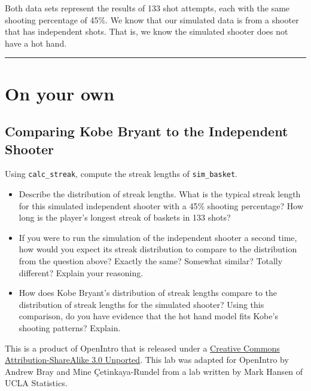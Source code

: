 \documentclass[]{book}
\theoremstyle{definition}
\theoremstyle{definition}
\theoremstyle{remark}
\begin{document}
Both data sets represent the results of 133 shot attempts, each with the
same shooting percentage of 45\%. We know that our simulated data is
from a shooter that has independent shots. That is, we know the
simulated shooter does not have a hot hand.

\begin{center}\rule{0.5\linewidth}{\linethickness}\end{center}

\section*{On your own}\label{on-your-own}

\subsection*{Comparing Kobe Bryant to the Independent
Shooter}\label{comparing-kobe-bryant-to-the-independent-shooter}

Using \texttt{calc\_streak}, compute the streak lengths of
\texttt{sim\_basket}.

\begin{itemize}
\item
  Describe the distribution of streak lengths. What is the typical
  streak length for this simulated independent shooter with a 45\%
  shooting percentage? How long is the player's longest streak of
  baskets in 133 shots?
\item
  If you were to run the simulation of the independent shooter a second
  time, how would you expect its streak distribution to compare to the
  distribution from the question above? Exactly the same? Somewhat
  similar? Totally different? Explain your reasoning.
\item
  How does Kobe Bryant's distribution of streak lengths compare to the
  distribution of streak lengths for the simulated shooter? Using this
  comparison, do you have evidence that the hot hand model fits Kobe's
  shooting patterns? Explain.
\end{itemize}

\hypertarget{license}{}
This is a product of OpenIntro that is released under a
\href{http://creativecommons.org/licenses/by-sa/3.0}{Creative Commons
Attribution-ShareAlike 3.0 Unported}. This lab was adapted for OpenIntro
by Andrew Bray and Mine Çetinkaya-Rundel from a lab written by Mark
Hansen of UCLA Statistics.
\end{document}
